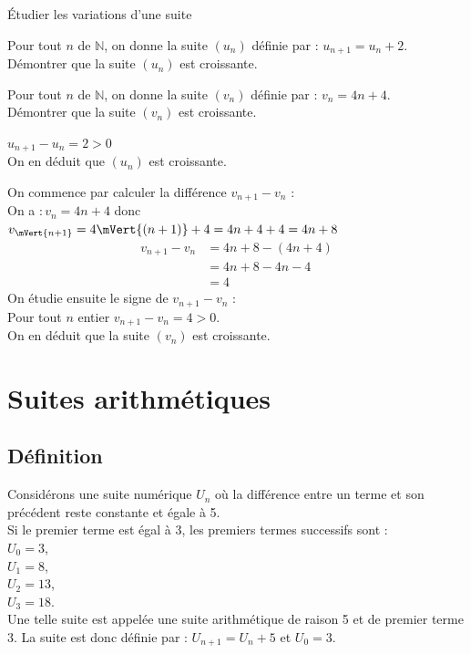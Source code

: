 \begin{methodeTitre}{Étudier les variations d'une suite}
\begin{enumMet}
\item Pour tout $n$ de $\mathbb{N}$, on donne la suite $\left(u_{n}\right)$ définie par : $u_{n+1}=u_{n}+2$.\\
Démontrer que la suite $\left(u_{n}\right)$ est croissante.
\item Pour tout $n$ de $\mathbb{N}$, on donne la suite $\left(v_{n}\right)$ définie par : $v_{n}=4 n+4$.\\
Démontrer que la suite $\left(v_{n}\right)$ est croissante.
\end{enumMet}
\begin{enumMet}
\item $u_{n+1}-u_{n}=2>0$\\
On en déduit que $\left(u_{n}\right)$ est croissante.
\item On commence par calculer la différence $v_{n+1}-v_{n}$ :\\
On a $: v_{n}=4 n+4$ donc $v_{\mVert{n+1}}=4\mVert{(n+1)}+4=4 n+4+4=4 n+8$
\begin{align*}
v_{n+1}-v_{n}&=4 n+8-(4 n+4) \\
&=4 n+8-4 n-4 \\
&=4
\end{align*}
On étudie ensuite le signe de $v_{n+1}-v_{n}$ :\\
Pour tout $n$ entier $v_{n+1}-v_{n}=4>0$.\\
On en déduit que la suite $\left(v_{n}\right)$ est croissante.
\end{enumMet}
\end{methodeTitre}


\section{Suites arithmétiques}

\subsection{Définition}

\begin{exemple}
    Considérons une suite numérique $U_n$ où la différence entre un terme et son précédent reste constante et égale à 5.\\
    Si le premier terme est égal à 3, les premiers termes successifs sont :\\
    $U_0 = 3$,\\
    $U_1 = 8$,\\
    $U_2 = 13$,\\
    $U_3 = 18$.\\
    Une telle suite est appelée une suite arithmétique de raison 5 et de premier terme 3.
    La suite est donc définie par : $U_{n+1}=U_n+5$ et $U_0=3$.
\end{exemple}

